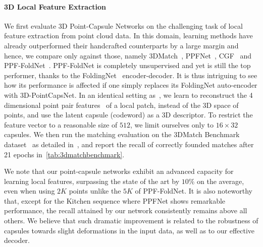\documentclass[10pt,twocolumn,letterpaper]{article}
\theoremstyle{break}
\begin{document}
\paragraph{3D Local Feature Extraction}
We first evaluate 3D Point-Capsule Networks on the challenging task of local feature extraction from point cloud data. 
In this domain, learning methods have already outperformed their handcrafted counterparts by a large margin and hence, we compare only against those, namely 3DMatch~\cite{zeng20163dmatch}, PPFNet~\cite{deng2018ppfnet}, CGF~\cite{Khoury_2017_ICCV}
and PPF-FoldNet~\cite{Deng_2018_ECCV}. PPF-FoldNet is completely unsupervised and yet is still the top performer, thanks to the FoldingNet~\cite{Yang_2018_CVPR} encoder-decoder. It is thus intriguing to see how its performance is affected if one simply replaces its FoldingNet auto-encoder with 3D-PointCapsNet. In an identical setting as~\cite{Deng_2018_ECCV}, we learn to reconstruct the 4 dimensional point pair features~\cite{birdal2015point, birdal2017point} of a local patch, instead of the 3D space of points, and use the latent capsule (codeword) as a 3D descriptor. To restrict the feature vector to a reasonable size of $512$, we limit ourselves only to $16 \times 32$ capsules. 
We then run the matching evaluation on the 3DMatch Benchmark dataset~\cite{zeng20163dmatch} as detailed in~\cite{Deng_2018_ECCV}, and report the recall of correctly founded matches after 21 epochs in~\cref{tab:3dmatchbenchmark}.

We note that our point-capsule networks exhibit an advanced capacity for learning local features, surpassing the state of the art by $10\%$ on the average, even when using $2K$ points unlike the $5K$ of PPF-FoldNet. It is also noteworthy that, except for the Kitchen sequence where PPFNet shows remarkable performance, the recall attained by our network consistently remains above all others. We believe that such dramatic improvement is related to the robustness of capsules towards slight deformations in the input data, as well as to our effective decoder.\vspace{-2mm}
\end{document}
